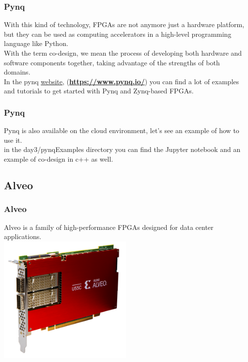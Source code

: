 \documentclass{beamer}
\begin{document}
\begin{frame}\frametitle{Pynq}

With this kind of technology, FPGAs are not anymore 
just a hardware platform, but they can be used as
computing accelerators in a high-level programming
language like Python. \\
\vspace{0.7cm}
With the term co-design, we mean the process of
developing both hardware and software components
together, taking advantage of the strengths of both
domains. \\
\vspace{0.7cm}
In the pynq \href{https://www.pynq.io/}{website},
(\href{https://www.pynq.io/}
{\textbf{https://www.pynq.io/}})
you can find a lot of examples
and tutorials to get started with Pynq and Zynq-based
FPGAs. 
\end{frame}

\begin{frame}\frametitle{Pynq}
Pynq is also available on the cloud environment,
let's see an example of how to use it. \\
\vspace{1cm}
in the day3/pynqExamples directory you can find
the Jupyter notebook and an example of co-design
in c++ as well.
\end{frame}

\subsection{Alveo}

\begin{frame}\frametitle{Alveo}
Alveo is a family of high-performance FPGAs designed 
for data center applications. \\
\vspace{1cm}
\centering
\includegraphics[width=0.5\textwidth]{alveou55c.png}
\end{frame}
\end{document}

